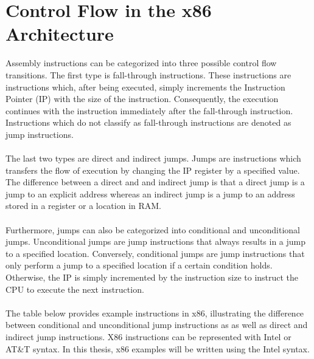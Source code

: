 \documentclass{kththesis}
\newcommand{\fbcomment}[1]{{#1}}
\renewcommand{\fbcomment}[1]{}
\begin{document}
\section{Control Flow in the x86 Architecture}\label{sec:controlFlowInX86}
\fbcomment{\color{red}Goal: Give the reader an understanding of what assembly instructions affect control flow and how}
Assembly instructions can be categorized into three possible control flow transitions\cite{CFGFromPowerPC}. The first type is fall-through instructions. These instructions are instructions which, after being executed, simply increments the Instruction Pointer (IP) with the size of the instruction. Consequently, the execution continues with the instruction immediately after the fall-through instruction. Instructions which do not classify as fall-through instructions are denoted as jump instructions. 
\\ \\
The last two types are direct and indirect jumps. Jumps are instructions which transfers the flow of execution by changing the IP register by a specified value. The difference between a direct and and indirect jump is that a direct jump is a jump to an explicit address whereas an indirect jump is a jump to an address stored in a register or a location in RAM. 
\\ \\
Furthermore, jumps can also be categorized into conditional and unconditional jumps. Unconditional jumps are jump instructions that always results in a jump to a specified location. Conversely, conditional jumps are jump instructions that only perform a jump to a specified location if a certain condition holds. Otherwise, the IP is simply incremented by the instruction size to instruct the CPU to execute the next instruction. 
\\ \\
The table below provides example instructions in x86, illustrating the difference between conditional and unconditional jump instructions as as well as direct and indirect jump instructions. X86 instructions can be represented with Intel or AT\&T syntax. In this thesis, x86 examples will be written using the Intel syntax.
\end{document}
